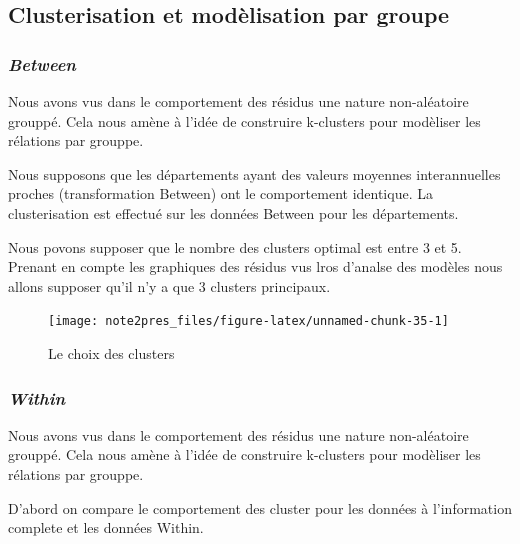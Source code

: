 \documentclass[11pt,]{article}
\begin{document}
\FloatBarrier

\hypertarget{clusterisation-et-modelisation-par-groupe}{%
\subsection{Clusterisation et modèlisation par
groupe}\label{clusterisation-et-modelisation-par-groupe}}

\hypertarget{between}{%
\subsubsection{\texorpdfstring{\emph{Between}}{Between}}\label{between}}

Nous avons vus dans le comportement des résidus une nature non-aléatoire
grouppé. Cela nous amène à l'idée de construire k-clusters pour
modèliser les rélations par grouppe.

\par

Nous supposons que les départements ayant des valeurs moyennes
interannuelles proches (transformation Between) ont le comportement
identique. La clusterisation est effectué sur les données Between pour
les départements.

Nous povons supposer que le nombre des clusters optimal est entre 3 et
5. Prenant en compte les graphiques des résidus vus lros d'analse des
modèles nous allons supposer qu'il n'y a que 3 clusters principaux.

\FloatBarrier

\begin{figure}[!htbp]

{\centering \texttt{[image: note2pres\_files/figure-latex/unnamed-chunk-35-1]} 

}

\caption{Le choix des clusters}\label{fig:unnamed-chunk-35}
\end{figure}

\FloatBarrier

\hypertarget{within}{%
\subsubsection{\texorpdfstring{\emph{Within}}{Within}}\label{within}}

Nous avons vus dans le comportement des résidus une nature non-aléatoire
grouppé. Cela nous amène à l'idée de construire k-clusters pour
modèliser les rélations par grouppe.

D'abord on compare le comportement des cluster pour les données à
l'information complete et les données Within.
\end{document}
